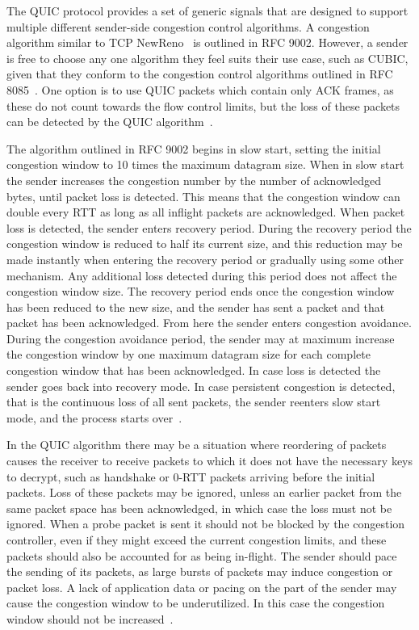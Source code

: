 \documentclass[english, 12pt, a4paper, elec, utf8, a-2b, online]{aaltothesis}
\begin{document}
The QUIC protocol provides a set of generic signals that are designed to support
multiple different sender-side congestion control algorithms. A congestion algorithm similar
to TCP NewReno~\cite{rfc6582} is outlined in RFC 9002. However, a sender is free to
choose any one algorithm they feel suits their use case, such as CUBIC, given that they conform
to the congestion control algorithms outlined in RFC 8085~\cite{rfc8085}. One option
is to use QUIC packets which contain only ACK frames, as these do not count towards
the flow control limits, but the loss of these packets can be detected by the QUIC
algorithm~\cite{rfc9002}.

The algorithm outlined in RFC 9002 begins in slow start, setting the initial congestion
window to 10 times the maximum datagram size. When in slow start the sender increases
the congestion number by the number of acknowledged bytes, until packet loss is detected. This
means that the congestion window can double every RTT as long as all inflight packets
are acknowledged. When packet loss is detected, the sender enters recovery period.
During the recovery period the congestion window is reduced to half its current
size, and this reduction may be made instantly when entering the recovery period
or gradually using some other mechanism. Any additional loss detected during this
period does not affect the congestion window size. The recovery period ends once
the congestion window has been reduced to the new size, and the sender has sent
a packet and that packet has been acknowledged. From here the sender enters congestion 
avoidance. During the congestion avoidance period, the sender may at maximum increase
the congestion window by one maximum datagram size for each complete congestion
window that has been acknowledged. In case loss is detected the sender goes back
into recovery mode. In case persistent congestion is detected, that is the continuous
loss of all sent packets, the sender reenters slow start mode, and the process
starts over~\cite{rfc9002}.

In the QUIC algorithm there may be a situation where reordering of packets causes
the receiver to receive packets to which it does not have the necessary keys to
decrypt, such as handshake or 0-RTT packets arriving before the initial packets.
Loss of these packets may be ignored, unless an earlier packet from the same packet space
has been acknowledged, in which case the loss must not be ignored. When a probe
packet is sent it should not be blocked by the congestion controller, even if they might exceed the current
congestion limits, and these packets should also be accounted for as being in-flight. The
sender should pace the sending of its packets, as large bursts of packets may induce 
congestion or packet loss. A lack of application data or pacing on the part of the
sender may cause the congestion window to be underutilized. In this case the congestion
window should not be increased~\cite{rfc9002}.
\end{document}
